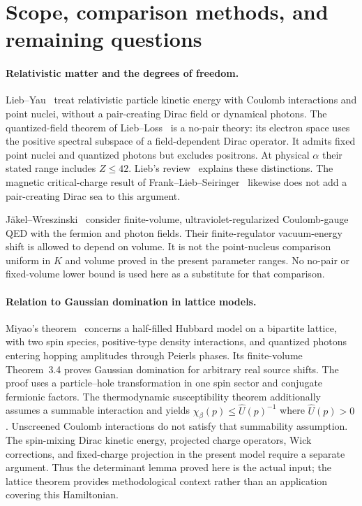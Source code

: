 \section{Scope, comparison methods, and remaining questions}
\label{context:scope}

\paragraph{Relativistic matter and the degrees of freedom.}
Lieb--Yau~\cite{LY1988} treat relativistic particle kinetic energy
with Coulomb interactions and point nuclei, without a pair-creating
Dirac field or dynamical photons. The quantized-field theorem of
Lieb--Loss~\cite{LL2002} is a no-pair theory: its electron space
uses the positive spectral subspace of a field-dependent Dirac
operator. It admits fixed point nuclei and quantized photons but
excludes positrons. At physical $\alpha$ their stated range includes
$Z\le42$. Lieb's review~\cite{Lieb2002} explains these distinctions.
The magnetic critical-charge result of
Frank--Lieb--Seiringer~\cite{FLS2007} likewise does not add a
pair-creating Dirac sea to this argument.

J\"akel--Wreszinski~\cite{JW2018} consider finite-volume,
ultraviolet-regularized Coulomb-gauge QED with the fermion and photon
fields. Their finite-regulator vacuum-energy shift is allowed to
depend on volume. It is not the point-nucleus comparison uniform
in $K$ and volume proved in the present parameter ranges.
No no-pair or fixed-volume lower bound is used here as a substitute
for that comparison.

\paragraph{Relation to Gaussian domination in lattice models.}
Miyao's theorem~\cite{Miyao} concerns a half-filled Hubbard model on a
bipartite lattice, with two spin species, positive-type density interactions,
and quantized photons entering hopping amplitudes through Peierls phases.
Its finite-volume Theorem~3.4 proves Gaussian domination for arbitrary real
source shifts.  The proof uses a particle--hole transformation in one spin
sector and conjugate fermionic factors.  The thermodynamic susceptibility
theorem additionally assumes a summable interaction and yields
$\chi_\beta(p)\leq\widehat U(p)^{-1}$ where $\widehat U(p)>0$.
Unscreened Coulomb interactions do not satisfy that summability assumption.
The spin-mixing Dirac kinetic energy, projected charge operators, Wick
corrections, and fixed-charge projection in the present model require a
separate argument.  Thus the determinant lemma proved here is the actual
input; the lattice theorem provides methodological context rather than an
application covering this Hamiltonian.

